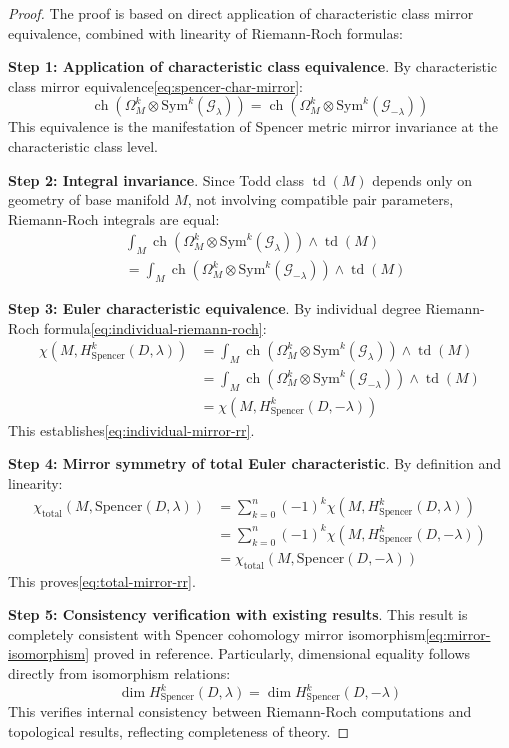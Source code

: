 \documentclass[a4paper,12pt]{extarticle}
\newcommand{\ch}{\operatorname{ch}}
\newcommand{\td}{\operatorname{td}}
\theoremstyle{definition}
\begin{document}
\begin{proof}
The proof is based on direct application of characteristic class mirror equivalence, combined with linearity of Riemann-Roch formulas:

\textbf{Step 1: Application of characteristic class equivalence}. By characteristic class mirror equivalence\eqref{eq:spencer-char-mirror}:
$$\ch(\Omega^k_M \otimes \mathrm{Sym}^k(\mathcal{G}_{\lambda})) = \ch(\Omega^k_M \otimes \mathrm{Sym}^k(\mathcal{G}_{-\lambda}))$$
This equivalence is the manifestation of Spencer metric mirror invariance at the characteristic class level.

\textbf{Step 2: Integral invariance}. Since Todd class $\td(M)$ depends only on geometry of base manifold $M$, not involving compatible pair parameters, Riemann-Roch integrals are equal:
\begin{align}
&\int_M \ch(\Omega^k_M \otimes \mathrm{Sym}^k(\mathcal{G}_{\lambda})) \wedge \td(M) \\
&= \int_M \ch(\Omega^k_M \otimes \mathrm{Sym}^k(\mathcal{G}_{-\lambda})) \wedge \td(M)
\end{align}

\textbf{Step 3: Euler characteristic equivalence}. By individual degree Riemann-Roch formula\eqref{eq:individual-riemann-roch}:
\begin{align}
\chi(M, H^k_{\mathrm{Spencer}}(D,\lambda)) &= \int_M \ch(\Omega^k_M \otimes \mathrm{Sym}^k(\mathcal{G}_{\lambda})) \wedge \td(M) \\
&= \int_M \ch(\Omega^k_M \otimes \mathrm{Sym}^k(\mathcal{G}_{-\lambda})) \wedge \td(M) \\
&= \chi(M, H^k_{\mathrm{Spencer}}(D,-\lambda))
\end{align}
This establishes\eqref{eq:individual-mirror-rr}.

\textbf{Step 4: Mirror symmetry of total Euler characteristic}. By definition and linearity:
\begin{align}
\chi_{\mathrm{total}}(M, \mathrm{Spencer}(D,\lambda)) &= \sum_{k=0}^n (-1)^k \chi(M, H^k_{\mathrm{Spencer}}(D,\lambda)) \\
&= \sum_{k=0}^n (-1)^k \chi(M, H^k_{\mathrm{Spencer}}(D,-\lambda)) \\
&= \chi_{\mathrm{total}}(M, \mathrm{Spencer}(D,-\lambda))
\end{align}
This proves\eqref{eq:total-mirror-rr}.

\textbf{Step 5: Consistency verification with existing results}. This result is completely consistent with Spencer cohomology mirror isomorphism\eqref{eq:mirror-isomorphism} proved in reference\cite{zheng2025mirror}. Particularly, dimensional equality follows directly from isomorphism relations:
$$\dim H^k_{\mathrm{Spencer}}(D,\lambda) = \dim H^k_{\mathrm{Spencer}}(D,-\lambda)$$
This verifies internal consistency between Riemann-Roch computations and topological results, reflecting completeness of theory.


\end{proof}
\end{document}
